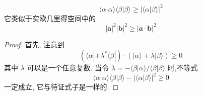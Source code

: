 	\begin{lemma}\label{lem:1.1}
		\begin{equation}
			\langle \alpha \left| {\alpha \rangle \langle \beta }\right| \beta \rangle \geq {\left| \langle \alpha | \beta \rangle \right| }^{2}
		\end{equation}
		它类似于实欧几里得空间中的
		\begin{equation}
			{\left| \mathbf{a}\right| }^{2}{\left| \mathbf{b}\right| }^{2} \geq {\left| \mathbf{a} \cdot \mathbf{b}\right| }^{2}
		\end{equation}
	\end{lemma}
	\begin{proof}
		首先, 注意到
		\begin{equation}
			(\langle\alpha|+{\lambda }^{*}\langle \beta|)\cdot(|\alpha\rangle+\lambda|\beta\rangle) \geq 0
		\end{equation}
		其中 $\lambda$ 可以是一个任意复数. 当令 $\lambda = - \langle \beta | \alpha \rangle /\langle \beta | \beta \rangle$ 时,不等式
		\begin{equation}
			\langle \alpha \left| {\alpha \rangle \langle \beta }\right| \beta \rangle - {\left| \langle \alpha | \beta \rangle \right| }^{2} \geq 0
		\end{equation}
		一定成立, 它与待证式子是一样的.
	\end{proof}
	
